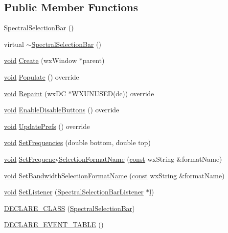 \subsection*{Public Member Functions}
\begin{DoxyCompactItemize}
\item 
\hyperlink{class_spectral_selection_bar_a1652d04af746753dd10b2d8d9e7a4edc}{Spectral\+Selection\+Bar} ()
\item 
virtual \hyperlink{class_spectral_selection_bar_aeb5193c7bc658fac20b3934dd87996eb}{$\sim$\+Spectral\+Selection\+Bar} ()
\item 
\hyperlink{sound_8c_ae35f5844602719cf66324f4de2a658b3}{void} \hyperlink{class_spectral_selection_bar_ad82ae9a7fd1fb7886895db4aaaef90ca}{Create} (wx\+Window $\ast$parent)
\item 
\hyperlink{sound_8c_ae35f5844602719cf66324f4de2a658b3}{void} \hyperlink{class_spectral_selection_bar_a5059489f7d7a9eb0c1e25d0a05591e7f}{Populate} () override
\item 
\hyperlink{sound_8c_ae35f5844602719cf66324f4de2a658b3}{void} \hyperlink{class_spectral_selection_bar_a146be2cb63cda851fe5730c6f22ee9b9}{Repaint} (wx\+DC $\ast$W\+X\+U\+N\+U\+S\+ED(dc)) override
\item 
\hyperlink{sound_8c_ae35f5844602719cf66324f4de2a658b3}{void} \hyperlink{class_spectral_selection_bar_ae1806f4481d7a9b808319e91b879b950}{Enable\+Disable\+Buttons} () override
\item 
\hyperlink{sound_8c_ae35f5844602719cf66324f4de2a658b3}{void} \hyperlink{class_spectral_selection_bar_a0f842a28da1ea9adb3c9ad50197e11b8}{Update\+Prefs} () override
\item 
\hyperlink{sound_8c_ae35f5844602719cf66324f4de2a658b3}{void} \hyperlink{class_spectral_selection_bar_a211b35a5b5d0ed1b95ef791d02ca8a04}{Set\+Frequencies} (double bottom, double top)
\item 
\hyperlink{sound_8c_ae35f5844602719cf66324f4de2a658b3}{void} \hyperlink{class_spectral_selection_bar_a9897ef5b181e36612b917af1141f4ac5}{Set\+Frequency\+Selection\+Format\+Name} (\hyperlink{getopt1_8c_a2c212835823e3c54a8ab6d95c652660e}{const} wx\+String \&format\+Name)
\item 
\hyperlink{sound_8c_ae35f5844602719cf66324f4de2a658b3}{void} \hyperlink{class_spectral_selection_bar_aec25dd01c218b66caca7dfdb36245475}{Set\+Bandwidth\+Selection\+Format\+Name} (\hyperlink{getopt1_8c_a2c212835823e3c54a8ab6d95c652660e}{const} wx\+String \&format\+Name)
\item 
\hyperlink{sound_8c_ae35f5844602719cf66324f4de2a658b3}{void} \hyperlink{class_spectral_selection_bar_affb3bda8860908b38c076c74e18aa605}{Set\+Listener} (\hyperlink{class_spectral_selection_bar_listener}{Spectral\+Selection\+Bar\+Listener} $\ast$\hyperlink{layer3_8c_a741dbb4d8e78c3cb69915db7282fcec0}{l})
\item 
\hyperlink{class_spectral_selection_bar_ae432427dddf507f200528b99b86801f2}{D\+E\+C\+L\+A\+R\+E\+\_\+\+C\+L\+A\+SS} (\hyperlink{class_spectral_selection_bar}{Spectral\+Selection\+Bar})
\item 
\hyperlink{class_spectral_selection_bar_aad3a249aeaf1c945008197506bf37f76}{D\+E\+C\+L\+A\+R\+E\+\_\+\+E\+V\+E\+N\+T\+\_\+\+T\+A\+B\+LE} ()
\end{DoxyCompactItemize}
